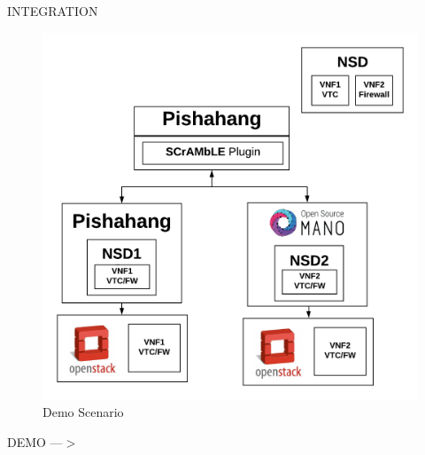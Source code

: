 
\begin{frame}

\Huge{\centerline{INTEGRATION}}

\end{frame}

\begin{frame}
\begin{figure}
	\centering
	\includegraphics[width=0.8\linewidth]{images/Integration}
	{\\ Demo Scenario}
	\label{fig:integration}
\end{figure}

\end{frame}

\begin{frame}

\Huge{\centerline{DEMO ---$ > $}}

\end{frame}